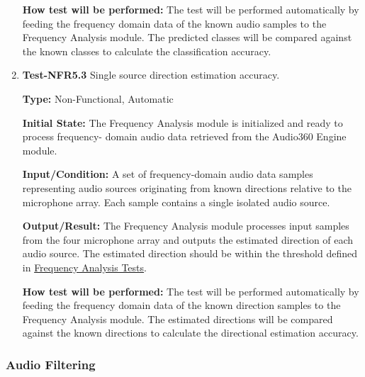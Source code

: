 \documentclass[12pt, titlepage]{article}
\begin{document}
\begin{enumerate}
\textbf{How test will be performed:}
The test will be performed automatically by feeding the frequency
domain data of the known audio samples to the Frequency Analysis module. The
predicted classes will be compared against the known classes to calculate
the classification accuracy.

\item{\textbf{Test-NFR5.3} Single source direction estimation accuracy.\\}

\textbf{Type:} Non-Functional, Automatic

\textbf{Initial State:}
The Frequency Analysis module is initialized and ready to process frequency-
domain audio data retrieved from the Audio360 Engine module.

\textbf{Input/Condition:}
A set of frequency-domain audio data samples representing audio sources
originating from known directions relative to the microphone array. Each
sample contains a single isolated audio source.

\textbf{Output/Result:}
The Frequency Analysis module processes input samples from the four microphone
array and outputs the estimated direction of each audio source. The estimated
direction should be within the threshold defined in 
\hyperref[sec:freq-analysis-tests]{Frequency Analysis Tests}.

\textbf{How test will be performed:}
The test will be performed automatically by feeding the frequency
domain data of the known direction samples to the Frequency Analysis module.
The estimated directions will be compared against the known directions to
calculate the directional estimation accuracy.


\end{enumerate}

\subsubsection{Audio Filtering}
\end{document}
